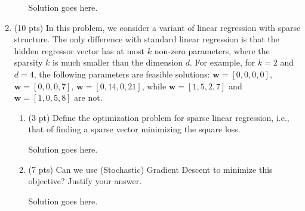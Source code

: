 \documentclass[a4paper]{article}
\theoremstyle{definition}
\renewcommand\vec[1]{\mathbf{#1}}
\newenvironment{soln}{
    \leavevmode\color{blue}\ignorespaces
}{}
\begin{document}
\begin{enumerate}
\begin{enumerate}
                \begin{soln}  Solution goes here. \end{soln}
        \end{enumerate}

  \item (10 pts) In this problem, we consider a variant of linear regression with sparse structure. The only difference with standard linear regression is that the hidden regressor vector has at most $k$ non-zero parameters, where the sparsity $k$ is much smaller than the dimension $d$. For example, for $k=2$ and $d=4$, the following parameters are feasible solutions: $\vec w=[0,0,0,0]$, $\vec w=[0,0,0,7]$,
        $\vec w=[0,14,0,21]$, while $\vec w=[1,5,2,7]$ and $\vec w=[1,0,5,8]$ are not.
        \begin{enumerate}
          \item (3 pt) Define the optimization problem for sparse linear regression, i.e., that of finding a sparse vector minimizing the square loss.

                \begin{soln}  Solution goes here. \end{soln}

          \item (7 pts) Can we use (Stochastic) Gradient Descent to minimize this objective? Justify your answer.

                \begin{soln}  Solution goes here. \end{soln}
        \end{enumerate}
\end{enumerate}
\end{document}
